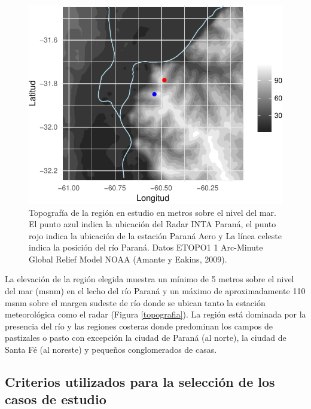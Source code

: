 \documentclass[12pt,spanish,oneside, a4paper]{book}
\begin{document}
\begin{figure}

{\centering \includegraphics{Tesis_files/figure-latex/topografia-1} 

}

\caption{Topografía de la región en estudio en metros sobre el nivel del mar. El punto azul indica la ubicación del Radar INTA Paraná, el punto rojo indica la ubicación de la estación Paraná Aero y La línea celeste indica la posición del río Paraná. Datos ETOPO1 1 Arc-Minute Global Relief Model NOAA (Amante y Eakins, 2009). \label{topografia}}\label{fig:topografia}
\end{figure}

La elevación de la región elegida muestra un mínimo de 5 metros sobre el
nivel del mar (msnm) en el lecho del río Paraná y un máximo de
aproximadamente 110 msnm sobre el margen sudeste de río donde se ubican
tanto la estación meteorológica como el radar (Figura \ref{topografia}).
La región está dominada por la presencia del río y las regiones costeras
donde predominan los campos de pastizales o pasto con excepción la
ciudad de Paraná (al norte), la ciudad de Santa Fé (al noreste) y
pequeños conglomerados de casas.

\subsection{\texorpdfstring{Criterios utilizados para la selección de
los casos de estudio
\label{sec-criterios}}{Criterios utilizados para la selección de los casos de estudio }}\label{criterios-utilizados-para-la-seleccion-de-los-casos-de-estudio}
\end{document}
